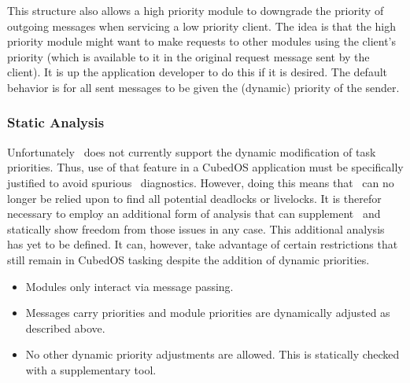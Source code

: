 This structure also allows a high priority module to downgrade the priority of outgoing messages
when servicing a low priority client. The idea is that the high priority module might want to
make requests to other modules using the client's priority (which is available to it in the
original request message sent by the client). It is up the application developer to do this if
it is desired. The default behavior is for all sent messages to be given the (dynamic) priority
of the sender.

\subsubsection{Static Analysis}

Unfortunately \SPARK\ does not currently support the dynamic modification of task priorities.
Thus, use of that feature in a CubedOS application must be specifically justified to avoid
spurious \SPARK\ diagnostics. However, doing this means that \SPARK\ can no longer be relied
upon to find all potential deadlocks or livelocks. It is therefor necessary to employ an
additional form of analysis that can supplement \SPARK\ and statically show freedom from those
issues in any case. This additional analysis has yet to be defined. It can, however, take
advantage of certain restrictions that still remain in CubedOS tasking despite the addition of
dynamic priorities.

\begin{itemize}
\item Modules only interact via message passing.
\item Messages carry priorities and module priorities are dynamically adjusted as described above.
\item No other dynamic priority adjustments are allowed.  This is statically checked with a supplementary tool. 
\end{itemize}


